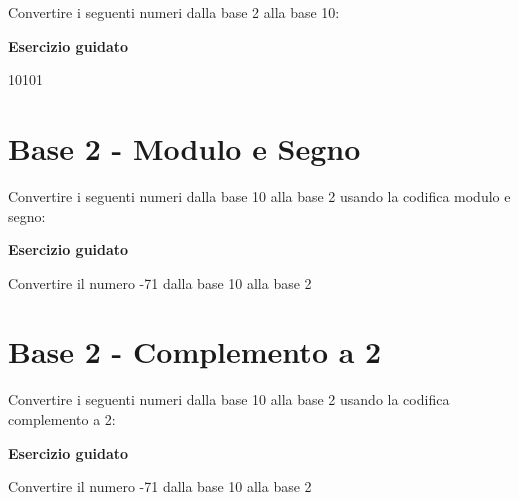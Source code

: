 \documentclass[11pt,fleqn]{book}
\begin{document}

\newpage

\noindent
Convertire i seguenti numeri dalla base 2 alla base 10:

\vspace{0.5cm}

\begin{esercizio}[1]
    \textbf{Esercizio guidato}

    10101

    \immediate{}
    
\end{esercizio}


\newpage

\section{Base 2 - Modulo e Segno}

Convertire i seguenti numeri dalla base 10 alla base 2 usando la codifica modulo e segno:

\begin{esercizio}[1]
    \textbf{Esercizio guidato}

    Convertire il numero -71 dalla base 10 alla base 2

    \immediate{}
    

\end{esercizio}


\newpage

\section{Base 2 - Complemento a 2}

Convertire i seguenti numeri dalla base 10 alla base 2 usando la codifica complemento a 2:

\begin{esercizio}[1]
    \textbf{Esercizio guidato}

    Convertire il numero -71 dalla base 10 alla base 2

    \immediate{}
    

\end{esercizio}
\end{document}
